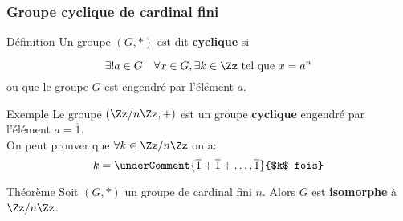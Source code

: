 \documentclass{beamer}
\begin{document}
\begin{frame}[t]
  \frametitle{Groupe cyclique de cardinal fini}
 \begin{block}{Définition}
   \small
   Un groupe $\left(G, *\right)$ est dit \textbf{\alert{cyclique}} si

   \begin{equation*}
     \exists! a \in G\quad \forall x \in G, \exists k\in \Zz \text{ tel que } x =
     a^n
   \end{equation*}
ou que le groupe $G$ est engendré par l'élément $a$.
 \end{block} 

 \begin{block}{Exemple}
   \small
   Le groupe $\left(\Zz/n\Zz, +\right)$ est un groupe \textbf{cyclique} engendré
   par l'élément $a = \overline{1}$.\\

   On peut prouver que $\forall k \in \Zz/n\Zz$ on a:
   \begin{equation*}
     k = \underComment{\overline{1} + \overline{1} + \ldots, \overline{1}}{$k$ fois}
   \end{equation*}
 \end{block}
 \begin{block}{Théorème}
   \small
   Soit $\left(G,*\right)$ un groupe de cardinal fini $n$. Alors $G$ est
  \textbf{\alert{isomorphe}}  à $\Zz/n\Zz$.
 \end{block}
\end{frame}
\end{document}

